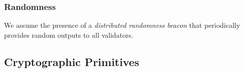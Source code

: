 




\subsubsection{Randomness}
We assume the presence of a \emph{distributed randomness beacon} that periodically provides random outputs to all validators. 

\subsection{Cryptographic Primitives}

